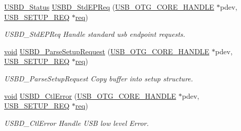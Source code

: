 \begin{DoxyCompactItemize}
\hyperlink{group___u_s_b_d___c_o_r_e___exported___defines_ga1c59ec10075b576176aa51c9ef4e9fc4}{U\-S\-B\-D\-\_\-\-Status} \hyperlink{group___u_s_b_d___r_e_q___exported___functions_prototype_gac02b5937b99e4f75a68427e5f12e12ea}{U\-S\-B\-D\-\_\-\-Std\-E\-P\-Req} (\hyperlink{group___u_s_b___c_o_r_e___exported___types_gaf76054c11eb8a3367907aad7ae700e80}{U\-S\-B\-\_\-\-O\-T\-G\-\_\-\-C\-O\-R\-E\-\_\-\-H\-A\-N\-D\-L\-E} $\ast$pdev, \hyperlink{group___u_s_b___c_o_r_e___exported___types_gacd8d898c844c3657315c7d7a4ea3a99c}{U\-S\-B\-\_\-\-S\-E\-T\-U\-P\-\_\-\-R\-E\-Q} $\ast$\hyperlink{pios__opahrs__proto_8h_ad651fd9affe5ed0ac9abccd8e2791a2c}{req})
\begin{DoxyCompactList}\small\item\em U\-S\-B\-D\-\_\-\-Std\-E\-P\-Req Handle standard usb endpoint requests. \end{DoxyCompactList}\item 
\hyperlink{group___n_a_m_e_ga18028b8badbf1ea7e704ccac3c488e82}{void} \hyperlink{group___u_s_b_d___r_e_q___exported___functions_prototype_gae533f652d3e81d8fc5e2bedc41659f7d}{U\-S\-B\-D\-\_\-\-Parse\-Setup\-Request} (\hyperlink{group___u_s_b___c_o_r_e___exported___types_gaf76054c11eb8a3367907aad7ae700e80}{U\-S\-B\-\_\-\-O\-T\-G\-\_\-\-C\-O\-R\-E\-\_\-\-H\-A\-N\-D\-L\-E} $\ast$pdev, \hyperlink{group___u_s_b___c_o_r_e___exported___types_gacd8d898c844c3657315c7d7a4ea3a99c}{U\-S\-B\-\_\-\-S\-E\-T\-U\-P\-\_\-\-R\-E\-Q} $\ast$\hyperlink{pios__opahrs__proto_8h_ad651fd9affe5ed0ac9abccd8e2791a2c}{req})
\begin{DoxyCompactList}\small\item\em U\-S\-B\-D\-\_\-\-Parse\-Setup\-Request Copy buffer into setup structure. \end{DoxyCompactList}\item 
\hyperlink{group___n_a_m_e_ga18028b8badbf1ea7e704ccac3c488e82}{void} \hyperlink{group___u_s_b_d___r_e_q___exported___functions_prototype_gac32cb444f3552aae822169540e7c6986}{U\-S\-B\-D\-\_\-\-Ctl\-Error} (\hyperlink{group___u_s_b___c_o_r_e___exported___types_gaf76054c11eb8a3367907aad7ae700e80}{U\-S\-B\-\_\-\-O\-T\-G\-\_\-\-C\-O\-R\-E\-\_\-\-H\-A\-N\-D\-L\-E} $\ast$pdev, \hyperlink{group___u_s_b___c_o_r_e___exported___types_gacd8d898c844c3657315c7d7a4ea3a99c}{U\-S\-B\-\_\-\-S\-E\-T\-U\-P\-\_\-\-R\-E\-Q} $\ast$\hyperlink{pios__opahrs__proto_8h_ad651fd9affe5ed0ac9abccd8e2791a2c}{req})
\begin{DoxyCompactList}\small\item\em U\-S\-B\-D\-\_\-\-Ctl\-Error Handle U\-S\-B low level Error. \end{DoxyCompactList}\item 

\end{DoxyCompactItemize}
